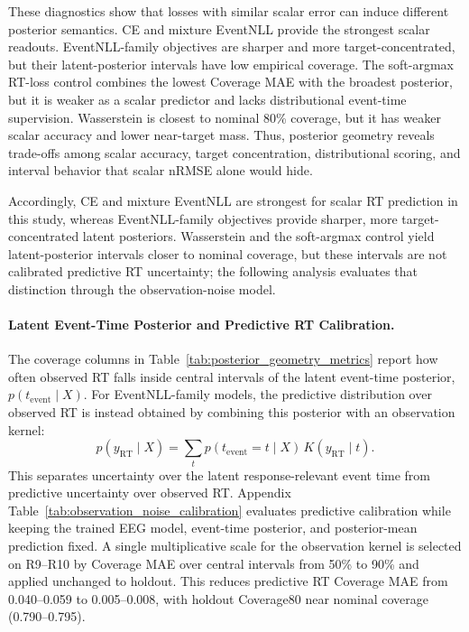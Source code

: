 \documentclass[12pt]{article}
\begin{document}
These diagnostics show that losses with similar scalar error can induce different posterior semantics. CE and mixture EventNLL provide the strongest scalar readouts. EventNLL-family objectives are sharper and more target-concentrated, but their latent-posterior intervals have low empirical coverage. The soft-argmax RT-loss control combines the lowest Coverage MAE with the broadest posterior, but it is weaker as a scalar predictor and lacks distributional event-time supervision. Wasserstein is closest to nominal 80\% coverage, but it has weaker scalar accuracy and lower near-target mass. Thus, posterior geometry reveals trade-offs among scalar accuracy, target concentration, distributional scoring, and interval behavior that scalar nRMSE alone would hide.

Accordingly, CE and mixture EventNLL are strongest for scalar RT prediction in this study, whereas EventNLL-family objectives provide sharper, more target-concentrated latent posteriors. Wasserstein and the soft-argmax control yield latent-posterior intervals closer to nominal coverage, but these intervals are not calibrated predictive RT uncertainty; the following analysis evaluates that distinction through the observation-noise model.

\paragraph{Latent Event-Time Posterior and Predictive RT Calibration.}
The coverage columns in Table~\ref{tab:posterior_geometry_metrics} report how often observed RT falls inside central intervals of the latent event-time posterior, \(p(t_{\mathrm{event}}\mid X)\). For EventNLL-family models, the predictive distribution over observed RT is instead obtained by combining this posterior with an observation kernel:
\[
p(y_{\mathrm{RT}}\mid X)=\sum_t p(t_{\mathrm{event}}=t\mid X)\,K(y_{\mathrm{RT}}\mid t).
\]
This separates uncertainty over the latent response-relevant event time from predictive uncertainty over observed RT. Appendix Table~\ref{tab:observation_noise_calibration} evaluates predictive calibration while keeping the trained EEG model, event-time posterior, and posterior-mean prediction fixed. A single multiplicative scale for the observation kernel is selected on R9--R10 by Coverage MAE over central intervals from 50\% to 90\% and applied unchanged to holdout. This reduces predictive RT Coverage MAE from 0.040--0.059 to 0.005--0.008, with holdout Coverage80 near nominal coverage (0.790--0.795).
\end{document}
